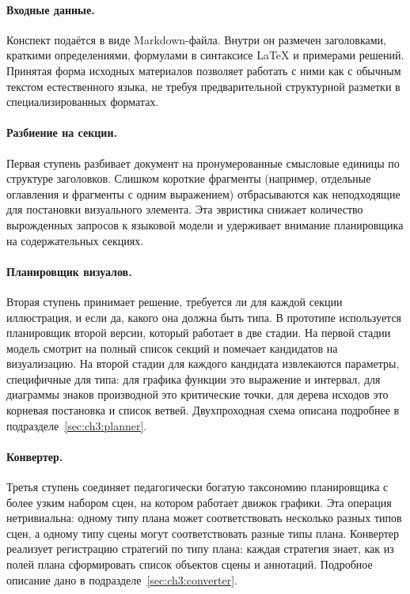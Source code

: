 \paragraph{Входные данные.} Конспект подаётся в виде Markdown\nobreakdash-файла. Внутри он размечен заголовками, краткими определениями, формулами в синтаксисе LaTeX и примерами решений. Принятая форма исходных материалов позволяет работать с ними как с обычным текстом естественного языка, не требуя предварительной структурной разметки в специализированных форматах.

\paragraph{Разбиение на секции.} Первая ступень разбивает документ на пронумерованные смысловые единицы по структуре заголовков. Слишком короткие фрагменты (например, отдельные оглавления и фрагменты с одним выражением) отбрасываются как неподходящие для постановки визуального элемента. Эта эвристика снижает количество вырожденных запросов к языковой модели и удерживает внимание планировщика на содержательных секциях.

\paragraph{Планировщик визуалов.} Вторая ступень принимает решение, требуется ли для каждой секции иллюстрация, и если да, какого она должна быть типа. В прототипе используется планировщик второй версии, который работает в две стадии. На первой стадии модель смотрит на полный список секций и помечает кандидатов на визуализацию. На второй стадии для каждого кандидата извлекаются параметры, специфичные для типа: для графика функции это выражение и интервал, для диаграммы знаков производной это критические точки, для дерева исходов это корневая постановка и список ветвей. Двухпроходная схема описана подробнее в подразделе~\ref{sec:ch3:planner}.

\paragraph{Конвертер.} Третья ступень соединяет педагогически богатую таксономию планировщика с более узким набором сцен, на котором работает движок графики. Эта операция нетривиальна: одному типу плана может соответствовать несколько разных типов сцен, а одному типу сцены могут соответствовать разные типы плана. Конвертер реализует регистрацию стратегий по типу плана: каждая стратегия знает, как из полей плана сформировать список объектов сцены и аннотаций. Подробное описание дано в подразделе~\ref{sec:ch3:converter}.

